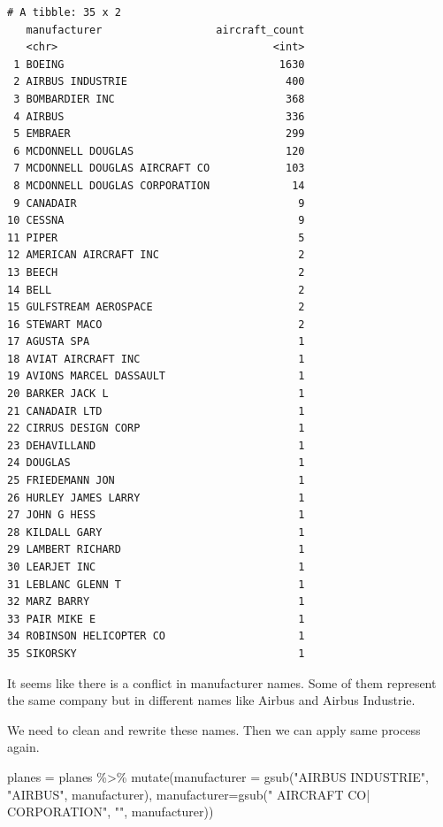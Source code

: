 \documentclass[
  letterpaper,
  DIV=11,
  numbers=noendperiod]{scrreprt}
\newenvironment{Shaded}{\begin{snugshade}}{\end{snugshade}}
\newcommand{\AttributeTok}[1]{\textcolor[rgb]{0.40,0.45,0.13}{#1}}
\newcommand{\FunctionTok}[1]{\textcolor[rgb]{0.28,0.35,0.67}{#1}}
\newcommand{\NormalTok}[1]{\textcolor[rgb]{0.00,0.23,0.31}{#1}}
\newcommand{\OtherTok}[1]{\textcolor[rgb]{0.00,0.23,0.31}{#1}}
\newcommand{\SpecialCharTok}[1]{\textcolor[rgb]{0.37,0.37,0.37}{#1}}
\newcommand{\StringTok}[1]{\textcolor[rgb]{0.13,0.47,0.30}{#1}}
\begin{document}
\begin{verbatim}
# A tibble: 35 x 2
   manufacturer                  aircraft_count
   <chr>                                  <int>
 1 BOEING                                  1630
 2 AIRBUS INDUSTRIE                         400
 3 BOMBARDIER INC                           368
 4 AIRBUS                                   336
 5 EMBRAER                                  299
 6 MCDONNELL DOUGLAS                        120
 7 MCDONNELL DOUGLAS AIRCRAFT CO            103
 8 MCDONNELL DOUGLAS CORPORATION             14
 9 CANADAIR                                   9
10 CESSNA                                     9
11 PIPER                                      5
12 AMERICAN AIRCRAFT INC                      2
13 BEECH                                      2
14 BELL                                       2
15 GULFSTREAM AEROSPACE                       2
16 STEWART MACO                               2
17 AGUSTA SPA                                 1
18 AVIAT AIRCRAFT INC                         1
19 AVIONS MARCEL DASSAULT                     1
20 BARKER JACK L                              1
21 CANADAIR LTD                               1
22 CIRRUS DESIGN CORP                         1
23 DEHAVILLAND                                1
24 DOUGLAS                                    1
25 FRIEDEMANN JON                             1
26 HURLEY JAMES LARRY                         1
27 JOHN G HESS                                1
28 KILDALL GARY                               1
29 LAMBERT RICHARD                            1
30 LEARJET INC                                1
31 LEBLANC GLENN T                            1
32 MARZ BARRY                                 1
33 PAIR MIKE E                                1
34 ROBINSON HELICOPTER CO                     1
35 SIKORSKY                                   1
\end{verbatim}

It seems like there is a conflict in manufacturer names. Some of them
represent the same company but in different names like Airbus and Airbus
Industrie.

We need to clean and rewrite these names. Then we can apply same process
again.

\begin{Shaded}
\begin{Highlighting}[]
\NormalTok{planes }\OtherTok{=}
\NormalTok{planes }\SpecialCharTok{\%\textgreater{}\%} 
  \FunctionTok{mutate}\NormalTok{(}\AttributeTok{manufacturer =} \FunctionTok{gsub}\NormalTok{(}\StringTok{"AIRBUS INDUSTRIE"}\NormalTok{, }\StringTok{"AIRBUS"}\NormalTok{, manufacturer), }\AttributeTok{manufacturer=}\FunctionTok{gsub}\NormalTok{(}\StringTok{" AIRCRAFT CO| CORPORATION"}\NormalTok{, }\StringTok{""}\NormalTok{, manufacturer))}
\end{Highlighting}
\end{Shaded}
\end{document}
